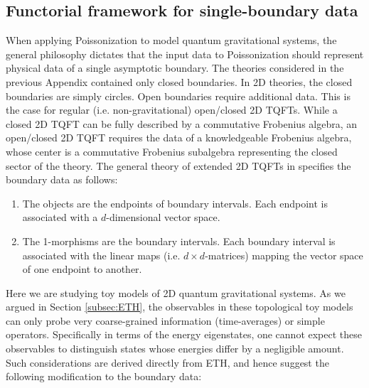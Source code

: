 \documentclass[a4paper,11pt]{article}
\theoremstyle{definition}
\numberwithin{equation}{section}
\begin{document}
\subsection{Functorial framework for single-boundary data}\label{subsection:simplechannel}

When applying Poissonization to model quantum gravitational systems, the general philosophy dictates that the input data to Poissonization should represent physical data of a single asymptotic boundary. The theories considered in the previous Appendix contained only closed boundaries. In 2D theories, the closed boundaries are simply circles. Open boundaries require additional data. This is the case for regular (i.e. non-gravitational) open/closed 2D TQFTs. While a closed 2D TQFT can be fully described by a commutative Frobenius algebra, an open/closed 2D TQFT requires the data of a knowledgeable Frobenius algebra, whose center is a commutative Frobenius subalgebra representing the closed sector of the theory. The general theory of extended 2D TQFTs in \cite{Lauda-Pfeiffer} specifies the boundary data as follows:
\begin{enumerate}
    \item The objects are the endpoints of boundary intervals. Each endpoint is associated with a $d$-dimensional vector space.
    \item The 1-morphisms are the boundary intervals. Each boundary interval is associated with the linear maps (i.e. $d\times d$-matrices) mapping the vector space of one endpoint to another. 
\end{enumerate}
Here we are studying toy models of 2D quantum gravitational systems. 
As we argued in Section \ref{subsec:ETH}, the observables in these topological toy models can only probe very coarse-grained information (time-averages) or simple operators. Specifically in terms of the energy eigenstates, one cannot expect these observables to distinguish states whose energies differ by a negligible amount. Such considerations are derived directly from ETH, and hence suggest the following modification to the boundary data:
\end{document}
